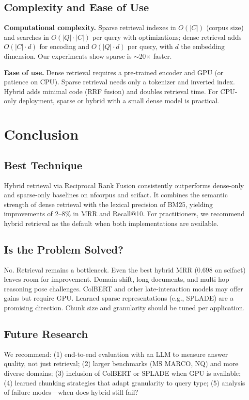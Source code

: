 \documentclass[twoside,11pt]{article}
\begin{document}
\subsection{Complexity and Ease of Use}

\textbf{Computational complexity.} Sparse retrieval indexes in $O(|C|)$ (corpus size) and searches in $O(|Q| \cdot |C|)$ per query with optimizations; dense retrieval adds $O(|C| \cdot d)$ for encoding and $O(|Q| \cdot d)$ per query, with $d$ the embedding dimension. Our experiments show sparse is $\sim$20$\times$ faster.

\textbf{Ease of use.} Dense retrieval requires a pre-trained encoder and GPU (or patience on CPU). Sparse retrieval needs only a tokenizer and inverted index. Hybrid adds minimal code (RRF fusion) and doubles retrieval time. For CPU-only deployment, sparse or hybrid with a small dense model is practical.

\section{Conclusion}

\subsection{Best Technique}

Hybrid retrieval via Reciprocal Rank Fusion consistently outperforms dense-only and sparse-only baselines on nfcorpus and scifact. It combines the semantic strength of dense retrieval with the lexical precision of BM25, yielding improvements of 2--8\% in MRR and Recall@10. For practitioners, we recommend hybrid retrieval as the default when both implementations are available.

\subsection{Is the Problem Solved?}

No. Retrieval remains a bottleneck. Even the best hybrid MRR (0.698 on scifact) leaves room for improvement. Domain shift, long documents, and multi-hop reasoning pose challenges. ColBERT and other late-interaction models may offer gains but require GPU. Learned sparse representations (e.g., SPLADE) are a promising direction. Chunk size and granularity should be tuned per application.

\subsection{Future Research}

We recommend: (1) end-to-end evaluation with an LLM to measure answer quality, not just retrieval; (2) larger benchmarks (MS MARCO, NQ) and more diverse domains; (3) inclusion of ColBERT or SPLADE when GPU is available; (4) learned chunking strategies that adapt granularity to query type; (5) analysis of failure modes---when does hybrid still fail?



\end{document}
